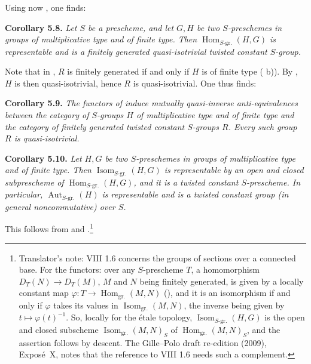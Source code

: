 Using now , one finds:

\par\medskip\noindent
\textbf{Corollary 5.8.}\enspace
\emph{Let \(S\) be a prescheme, and let \(G,H\) be two \(S\)-preschemes in
groups of multiplicative type and of finite type. Then
\(\operatorname{Hom}_{S\text{-gr.}}(H,G)\) is representable and is a
finitely generated quasi-isotrivial twisted constant \(S\)-group.}

Note that in , \(R\) is finitely generated if and only if \(H\) is
of finite type ( b)). By , \(H\) is then
quasi-isotrivial, hence \(R\) is quasi-isotrivial. One thus finds:

\par\medskip\noindent
\textbf{Corollary 5.9.}\enspace
\emph{The functors of  induce mutually quasi-inverse anti-equivalences
between the category of \(S\)-groups \(H\) of multiplicative type and of
finite type and the category of finitely generated twisted constant
\(S\)-groups \(R\). Every such group \(R\) is quasi-isotrivial.}

\par\medskip\noindent
\textbf{Corollary 5.10.}\enspace
\begingroup\itshape
Let \(H,G\) be two \(S\)-preschemes in groups of multiplicative type
and of finite type. Then \(\operatorname{Isom}_{S\text{-gr.}}(H,G)\) is
representable by an open and closed subprescheme of
\(\operatorname{Hom}_{S\text{-gr.}}(H,G)\), and it is a twisted constant
\(S\)-prescheme. In particular, \(\operatorname{Aut}_{S\text{-gr.}}(H)\) is
representable and is a twisted constant group (in general noncommutative)
over \(S\).
\par\endgroup

This follows from  and .\footnote{Translator's note: VIII 1.6 concerns the groups of sections
over a connected base. For the functors: over any \(S\)-prescheme \(T\), a
homomorphism \(D_T(N)\to D_T(M)\), \(M\) and \(N\) being finitely generated,
is given by a locally constant map
\(\varphi\colon T\to\operatorname{Hom}_{\mathrm{gr.}}(M,N)\)
(), and it is an isomorphism if and only if \(\varphi\) takes its
values in \(\operatorname{Isom}_{\mathrm{gr.}}(M,N)\), the inverse being given
by \(t\mapsto\varphi(t)^{-1}\). So, locally for the étale topology,
\(\operatorname{Isom}_{S\text{-gr.}}(H,G)\) is the open and closed
subscheme \(\operatorname{Isom}_{\mathrm{gr.}}(M,N)_S\) of
\(\operatorname{Hom}_{\mathrm{gr.}}(M,N)_S\), and the assertion follows by
descent. The Gille--Polo draft re-edition (2009), Expos\'e~X, notes that the
reference to VIII 1.6 needs such a complement.}

